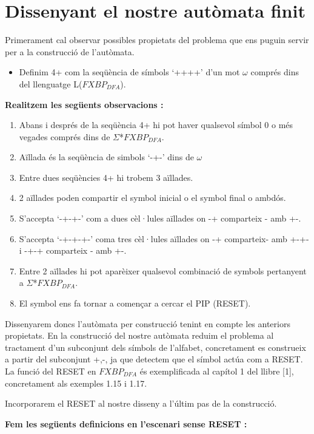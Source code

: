 \documentclass[12pt,a4paper]{report}
\def \w{$\omega$}
\def \dfa{$FXBP_{DFA} $}
\def \alphabetDFA{$\Sigma$*\dfa}
\begin{document}
\section{Dissenyant el nostre autòmata finit}

Primerament cal observar possibles propietats del problema que ens puguin servir per a la construcció de l’autòmata.

\begin{itemize}
\item Definim 4+ com la seqüència de símbols ‘++++’ d’un mot \w{} comprés dins del llenguatge L(\dfa{}).
\end{itemize}

\textbf{Realitzem les següents observacions :}

\begin{enumerate}
\item Abans i després de la seqüència 4+ hi pot haver qualsevol símbol 0 o més vegades comprés dins de \alphabetDFA{}.
\item Aïllada és la seqüència de simbols ‘-+-’ dins de \w{}
\item Entre dues seqüències 4+ hi trobem 3 aïllades. 
\item 2 aïllades poden compartir el symbol inicial o el symbol final o ambdós. 
\item S’accepta ‘-+-+-’ com a dues cèl·lules aïllades on -+ comparteix - amb +-. 
\item S’accepta ‘-+-+-+-’ coma  tres cèl·lules aïllades on -+ comparteix- amb +-+- i -+-+ comparteix - amb +-.
\item Entre 2 aïllades hi pot aparèixer qualsevol combinació de symbols pertanyent a \alphabetDFA{}.
\item El symbol \Return ens fa tornar a començar a cercar el PIP (RESET). 
\end{enumerate}


Dissenyarem doncs l’autòmata per construcció tenint en compte les anteriors propietats. En la construcció del nostre autòmata reduim el problema al tractament d’un subconjunt dels símbols de l’alfabet, concretament es construeix a partir del subconjunt {+,-}, ja que detectem que el símbol \Return actúa com a RESET. La funció del RESET en \dfa{} és exemplificada al capítol 1 del llibre [1], concretament als exemples 1.15 i 1.17.
 
Incorporarem el RESET al nostre disseny a l’últim pas de la construcció.

\textbf{Fem les següents definicions en l’escenari sense RESET :}
\end{document}
